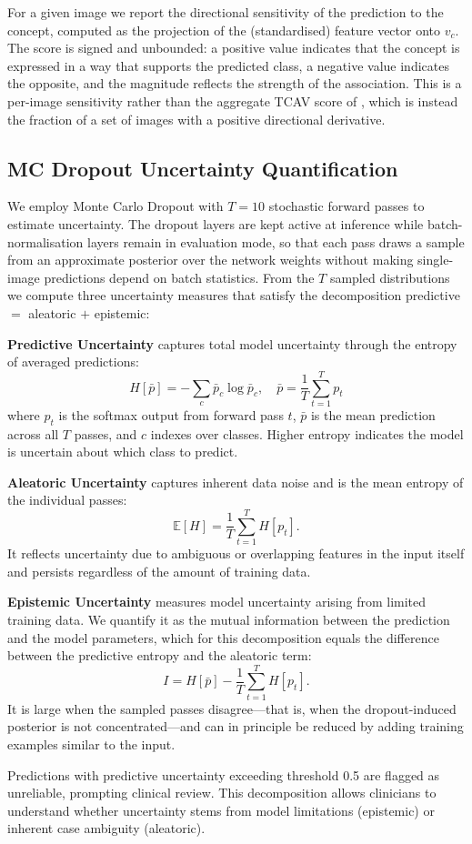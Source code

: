 For a given image we report the directional sensitivity of the prediction to the
concept, computed as the projection of the (standardised) feature vector onto
$v_c$. The score is signed and unbounded: a positive value indicates that the
concept is expressed in a way that supports the predicted class, a negative
value indicates the opposite, and the magnitude reflects the strength of the
association. This is a per-image sensitivity rather than the aggregate TCAV
score of \cite{kim2018interpretability}, which is instead the fraction of a set
of images with a positive directional derivative.

\subsection{MC Dropout Uncertainty Quantification}

We employ Monte Carlo Dropout \cite{gal2016dropout} with $T=10$ stochastic
forward passes to estimate uncertainty. The dropout layers are kept active at
inference while batch-normalisation layers remain in evaluation mode, so that
each pass draws a sample from an approximate posterior over the network weights
without making single-image predictions depend on batch statistics. From the $T$
sampled distributions we compute three uncertainty measures that satisfy the
decomposition predictive $=$ aleatoric $+$ epistemic:

\textbf{Predictive Uncertainty} captures total model uncertainty through
the entropy of averaged predictions:
\begin{equation}
    H[\bar{p}] = -\sum_c \bar{p}_c \log \bar{p}_c, \quad
    \bar{p} = \frac{1}{T}\sum_{t=1}^T p_t
\end{equation}
where $p_t$ is the softmax output from forward pass $t$, $\bar{p}$ is the
mean prediction across all $T$ passes, and $c$ indexes over classes. Higher
entropy indicates the model is uncertain about which class to predict.

\textbf{Aleatoric Uncertainty} captures inherent data noise and is the mean
entropy of the individual passes:
\begin{equation}
    \mathbb{E}[H] = \frac{1}{T}\sum_{t=1}^T H[p_t].
\end{equation}
It reflects uncertainty due to ambiguous or overlapping features in the input
itself and persists regardless of the amount of training data.

\textbf{Epistemic Uncertainty} measures model uncertainty arising from limited
training data. We quantify it as the mutual information between the prediction
and the model parameters, which for this decomposition equals the difference
between the predictive entropy and the aleatoric term:
\begin{equation}
    I = H[\bar{p}] - \frac{1}{T}\sum_{t=1}^T H[p_t].
\end{equation}
It is large when the sampled passes disagree---that is, when the
dropout-induced posterior is not concentrated---and can in principle be reduced
by adding training examples similar to the input.

Predictions with predictive uncertainty exceeding threshold 0.5 are flagged
as unreliable, prompting clinical review. This decomposition allows
clinicians to understand whether uncertainty stems from model limitations
(epistemic) or inherent case ambiguity (aleatoric).
